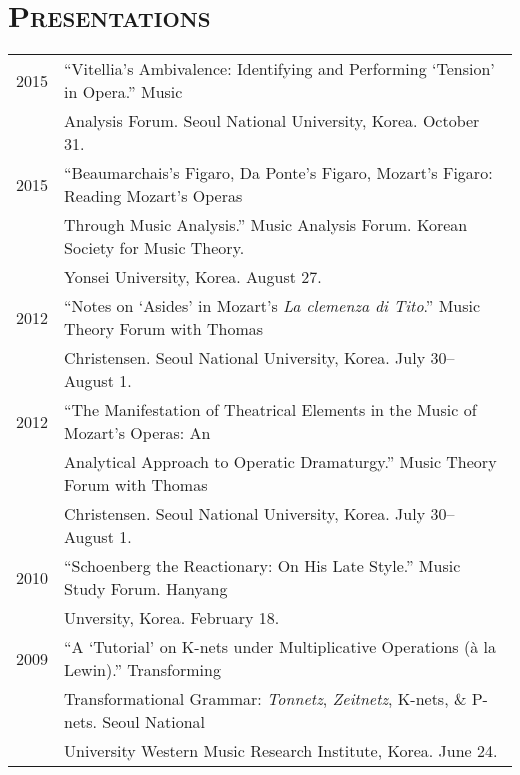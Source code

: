 \documentclass[letter,11pt]{article}
\begin{document}
  \vspace{2.5mm}
  
  \section*{\textsc{Presentations}}
  
  \hspace*{-0.25cm}
  \begin{tabular}{p{2.5cm} p{12.5cm}}
  2015 & ``Vitellia’s Ambivalence: Identifying and Performing ‘Tension’ in Opera.'' Music\\
  & Analysis Forum. Seoul National University, Korea. October 31.\\[2mm]
  
  2015 & ``Beaumarchais's Figaro, Da Ponte's Figaro, Mozart's Figaro: Reading Mozart's Operas\\
  & Through Music Analysis.'' Music Analysis Forum. Korean Society for Music Theory.\\
  & Yonsei University, Korea. August 27.\\[2mm]
  
  2012 & “Notes on ‘Asides’ in Mozart’s \textit{La clemenza di Tito}.” Music Theory Forum with Thomas\\
  & Christensen. Seoul National University, Korea. July 30–August 1.\\[2mm]

  2012 & “The Manifestation of Theatrical Elements in the Music of Mozart’s Operas: An\\
  & Analytical Approach to Operatic Dramaturgy.” Music Theory Forum with Thomas\\
  & Christensen. Seoul National University, Korea. July 30–August 1.\\[2mm]

  2010 & “Schoenberg the Reactionary: On His Late Style.” Music Study Forum. Hanyang\\
  & Unversity, Korea. February 18.\\[2mm]

  2009 & “A ‘Tutorial’ on K-nets under Multiplicative Operations (\`{a} la Lewin).” Transforming\\
  & Transformational Grammar: \textit{Tonnetz}, \textit{Zeitnetz}, K-nets, \& P-nets. Seoul National\\
  & University Western Music Research Institute, Korea. June 24.
  \end{tabular}
  
  \vspace{2.5mm}
  
\end{document}

